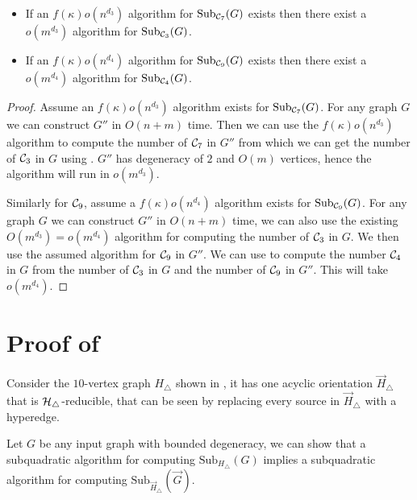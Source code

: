 \documentclass[a4paper,UKenglish,cleveref, autoref, numberwithinsect, thm-restate]{lipics-v2021}
\newcommand{\reducible}[1]{${#1}$-reducible}
\newcommand{\cycle}[1]{\cC_{#1}}
\newcommand{\hyperthree}{\cH_\triangle}
\newcommand{\expandGOdd}{G''}
\newcommand{\Sub}[2]{\mathrm{Sub}_{#2}(#1)}
\newcommand{\degen}{\kappa}
\newcommand{\cC}{{\cal C}}
\newcommand{\cH}{{\cal H}}
\begin{document}
		\begin{lemma}
			\begin{itemize}
			\item If an $f(\degen)o(n^{d_3})$ algorithm for $\Sub{G}{\cycle{7}}$ exists then there exist a $o(m^{d_3})$ algorithm for $\Sub{G}{\cycle{3}}$.
			\item If an $f(\degen)o(n^{d_4})$ algorithm for $\Sub{G}{\cycle{9}}$ exists then there exist a $o(m^{d_4})$ algorithm for $\Sub{G}{\cycle{4}}$.
		\end{itemize}
		\end{lemma}
		\begin{proof}
			Assume an $f(\degen)o(n^{d_3})$ algorithm exists for $\Sub{G}{\cycle{7}}$. For any graph $G$ we can construct $\expandGOdd$ in $O(n+m)$ time. Then we can use the $f(\degen)o(n^{d_3})$ algorithm to compute the number of $\cycle{7}$ in $\expandGOdd$ from which we can get the number of $\cycle{3}$ in $G$ using . $\expandGOdd$ has degeneracy of $2$ and $O(m)$ vertices, hence the algorithm will run in $o(m^{d_3})$.
			
			Similarly for $\cycle{9}$, assume a $f(\degen)o(n^{d_4})$ algorithm exists for $\Sub{G}{\cycle{9}}$. For any graph $G$ we can construct $\expandGOdd$ in $O(n+m)$ time, we can also use the existing $O(m^{d_3}) = o(m^{d_4})$ algorithm for computing the number of $\cycle{3}$ in $G$. We then use the assumed algorithm for $\cycle{9}$ in $\expandGOdd$. We can use  to compute the number $\cycle{4}$ in $G$ from the number of $\cycle{3}$ in $G$ and the number of $\cycle{9}$ in $\expandGOdd$. This will take $o(m^{d_4})$.
		\end{proof}
	
	
	
    \section{Proof of } \label{sec:hardness}

	Consider the $10$-vertex graph $H_\triangle$ shown in , it has one acyclic orientation $\vec{H}_\triangle$ that is \reducible{\hyperthree}, that can be seen by replacing every source in $\vec{H}_\triangle$  with a hyperedge.
	
	Let $G$ be any input graph with bounded degeneracy, we can show that a subquadratic algorithm for computing $\Sub{G}{H_\triangle}$ implies a subquadratic algorithm for computing $\Sub{\vec{G}}{\vec{H}_\triangle}$.
	
\end{document}
